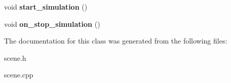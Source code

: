 \begin{DoxyCompactItemize}
\item 
\hypertarget{class_scene_a95c6652f9dab25c674e14c889a0d72db}{
void {\bfseries start\_\-simulation} ()}
\label{class_scene_a95c6652f9dab25c674e14c889a0d72db}

\item 
\hypertarget{class_scene_ac33fa4b1978d771eff630862331192c8}{
void {\bfseries on\_\-stop\_\-simulation} ()}
\label{class_scene_ac33fa4b1978d771eff630862331192c8}

\end{DoxyCompactItemize}


The documentation for this class was generated from the following files:\begin{DoxyCompactItemize}
\item 
scene.h\item 
scene.cpp\end{DoxyCompactItemize}
